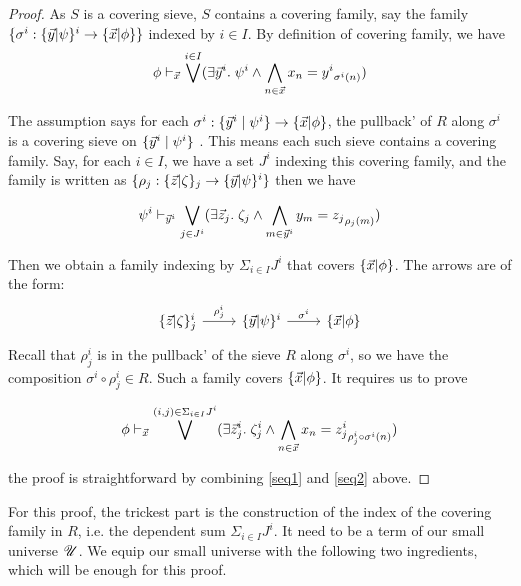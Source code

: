 \begin{proof}
  As $S$ is a covering sieve, $S$ contains a covering family, say the family $\{\sigma^i: \{ \vec{y} | \psi \}^i\to \{ \vec{x} | \phi \}\}$ indexed by $i\in I$. 
  By definition of covering family, we have 
  \begin{equation}\label{seq1}
    \phi \vdash_{\vec{x}} \bigvee^{i\in I} (\exists \vec{y}^i. \;\psi^i \wedge \bigwedge_{n \in \vec{x}} x_n = {y^i}_{\sigma^i(n)})
  \end{equation}

  The assumption says for each $\sigma^i: \{\vec{y}^i\mid \psi^i\} \to \{ \vec{x} | \phi \}$, the pullback' of $R$ along $\sigma^i$ is a covering sieve
  on  $\{\vec{y}^i\mid \psi^i\}$ .
  This means each such sieve contains a covering family. Say, for each $i\in I$, we have a set $J^i$ indexing this covering family, and 
  the family is written as $\{\rho_j: \{ \vec{z} | \zeta \}_j\to \{ \vec{y} | \psi \}^i\}$ then we have

  \begin{equation}\label{seq2}
    \psi^i \vdash_{\vec{y}^i} \bigvee_{j\in J^i}
     (\exists \vec{z}_j.\; \zeta_j \wedge \bigwedge_{m \in \vec{y}^i} y_m = {z_j}_{\rho_j(m)})
  \end{equation}

  Then we obtain a family indexing by $\Sigma_{i\in I}J^i$ that covers $\{ \vec{x} | \phi \}$. The arrows are of the form:
  \[
  \begin{tikzcd}
    \zzeta^i_j\ar[r,"\rho^i_j"] & \ypsi^i\ar[r,"\sigma^i"] & \xphi
  \end{tikzcd}
  \]
  Recall that $\rho^i_j$ is in the pullback' of the sieve $R$ along $\sigma^i$, so we have the composition $\sigma^i\circ \rho^i_j\in R$. 
  Such a family covers $\{ \vec{x} | \phi \}$. It requires us to prove 

  \begin{equation*}
    \phi \vdash_{\vec{x}} \bigvee^{(i,j)\in \Sigma_{i\in I}J^i} 
    (\exists \vec{z}^i_j.\; \zeta^i_j \wedge \bigwedge_{n\in \vec{x}} x_n = {z^i_j}_{\rho^i_j\circ \sigma^i(n)})
  \end{equation*}
  
  the proof is straightforward by combining \ref{seq1} and \ref{seq2} above. 

  
 
\end{proof}

For this proof, the trickest part is the construction of the index of the covering family in $R$, i.e. the dependent sum $\Sigma_{i\in I}J^i$. 
It need to be a term of our small universe $\mathscr{U}$. We equip our small universe with the following two ingredients, which will be enough for this proof.

